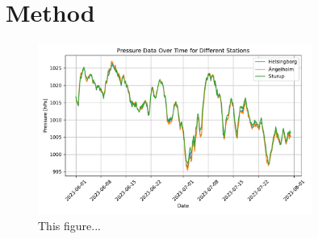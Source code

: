 \section{Method}
\begin{figure}[H]
    \centering    \includegraphics[width=0.8\textwidth]{Figures/Pressure_difference.pdf}
    \caption{This figure...}
    \label{fig:Pressure_difference}
\end{figure}
